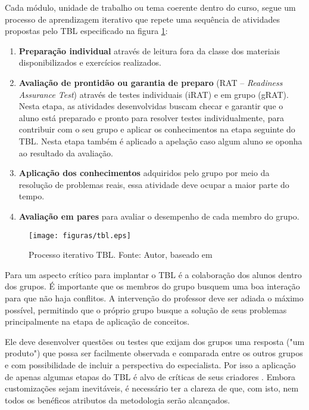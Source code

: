 Cada módulo, unidade de trabalho ou tema coerente dentro do curso, segue um processo de aprendizagem iterativo que repete uma sequência de atividades propostas pelo TBL especificado na figura \ref{fig:tbl}:

\begin{enumerate}
  \item \textbf{Preparação individual} através de leitura fora da classe dos materiais disponibilizados e exercícios realizados.
  \item \textbf{Avaliação de prontidão ou garantia de preparo} (RAT – \textit{Readiness Assurance Test}) através de testes individuais (iRAT) e em grupo (gRAT). Nesta etapa, as atividades desenvolvidas buscam checar e garantir que o aluno está preparado e pronto para resolver testes individualmente, para contribuir com o seu grupo e aplicar os conhecimentos na etapa seguinte do TBL. Nesta etapa também é aplicado a apelação caso algum aluno se oponha ao resultado da avaliação.
  \item \textbf{Aplicação dos conhecimentos} adquiridos pelo grupo por meio da resolução de problemas reais, essa atividade deve ocupar a maior parte do tempo.
  \item \textbf{Avaliação em pares} para avaliar o desempenho de cada membro do grupo.
\end{enumerate}

\begin{figure}[h!]
	\centering
  \texttt{[image: figuras/tbl.eps]}
  \caption[Processo iterativo TBL.]{Processo iterativo TBL. Fonte: Autor, baseado em \cite{bollela}}
	\label{fig:tbl}
\end{figure}

Para \cite{bollela} um aspecto crítico para implantar o TBL é a colaboração dos alunos dentro dos grupos. É importante que os membros do grupo busquem uma boa interação para que não haja conflitos. A intervenção do professor deve ser adiada o máximo possível, permitindo que o próprio grupo busque a solução de seus problemas principalmente na etapa de aplicação de conceitos.

Ele deve desenvolver questões ou testes que exijam dos grupos uma resposta ("um produto") que possa ser facilmente observada e comparada entre os outros grupos e com possibilidade de incluir a perspectiva do especialista. Por isso a aplicação de apenas algumas etapas do TBL é alvo de críticas de seus criadores \cite{sweet}. Embora customizações sejam inevitáveis, é necessário ter a clareza de que, com isto, nem todos os benéficos atributos da metodologia serão alcançados.

